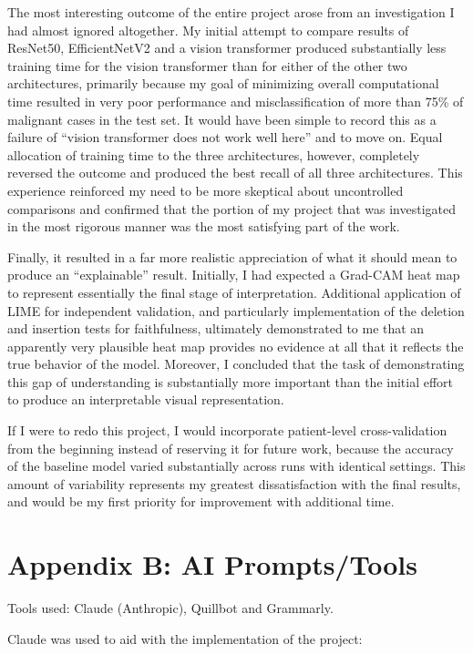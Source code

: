 The most interesting outcome of the entire project arose from an investigation I had almost ignored altogether. My initial attempt to compare results of ResNet50, EfficientNetV2 and a vision transformer produced substantially less training time for the vision transformer than for either of the other two architectures, primarily because my goal of minimizing overall computational time resulted in very poor performance and misclassification of more than 75\% of malignant cases in the test set. It would have been simple to record this as a failure of ``vision transformer does not work well here'' and to move on. Equal allocation of training time to the three architectures, however, completely reversed the outcome and produced the best recall of all three architectures. This experience reinforced my need to be more skeptical about uncontrolled comparisons and confirmed that the portion of my project that was investigated in the most rigorous manner was the most satisfying part of the work.

Finally, it resulted in a far more realistic appreciation of what it should mean to produce an ``explainable'' result. Initially, I had expected a Grad-CAM heat map to represent essentially the final stage of interpretation. Additional application of LIME for independent validation, and particularly implementation of the deletion and insertion tests for faithfulness, ultimately demonstrated to me that an apparently very plausible heat map provides no evidence at all that it reflects the true behavior of the model. Moreover, I concluded that the task of demonstrating this gap of understanding is substantially more important than the initial effort to produce an interpretable visual representation.

If I were to redo this project, I would incorporate patient-level cross-validation from the beginning instead of reserving it for future work, because the accuracy of the baseline model varied substantially across runs with identical settings. This amount of variability represents my greatest dissatisfaction with the final results, and would be my first priority for improvement with additional time.

\section{Appendix B: AI Prompts/Tools}
\label{appx:ai_prompt}

Tools used: Claude (Anthropic), Quillbot and Grammarly.

Claude was used to aid with the implementation of the project:

